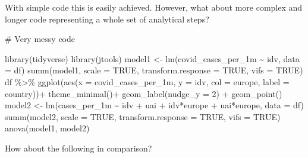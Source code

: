 \documentclass[
  letterpaper,
]{krantz}
\makeatletter
\newenvironment{Shaded}{\begin{snugshade}}{\end{snugshade}}
\newcommand{\AttributeTok}[1]{\textcolor[rgb]{0.40,0.45,0.13}{#1}}
\newcommand{\CommentTok}[1]{\textcolor[rgb]{0.37,0.37,0.37}{#1}}
\newcommand{\ConstantTok}[1]{\textcolor[rgb]{0.56,0.35,0.01}{#1}}
\newcommand{\DecValTok}[1]{\textcolor[rgb]{0.68,0.00,0.00}{#1}}
\newcommand{\FunctionTok}[1]{\textcolor[rgb]{0.28,0.35,0.67}{#1}}
\newcommand{\NormalTok}[1]{\textcolor[rgb]{0.00,0.23,0.31}{#1}}
\newcommand{\OtherTok}[1]{\textcolor[rgb]{0.00,0.23,0.31}{#1}}
\newcommand{\SpecialCharTok}[1]{\textcolor[rgb]{0.37,0.37,0.37}{#1}}
\newenvironment{kframe}{%
\medskip{}
\setlength{\fboxsep}{.8em}
 \def\at@end@of@kframe{}%
 \ifinner\ifhmode%
  \def\at@end@of@kframe{\end{minipage}}%
  \begin{minipage}{\columnwidth}%
 \fi\fi%
 \def\FrameCommand##1{\hskip\@totalleftmargin \hskip-\fboxsep
 \colorbox{shadecolor}{##1}\hskip-\fboxsep
     \hskip-\linewidth \hskip-\@totalleftmargin \hskip\columnwidth}%
 \MakeFramed {\advance\hsize-\width
   \@totalleftmargin\z@ \linewidth\hsize
   \@setminipage}}%
 {\par\unskip\endMakeFramed%
 \at@end@of@kframe}
\renewenvironment{Shaded}{\begin{kframe}}{\end{kframe}}
\makeatother
\begin{document}
With simple code this is easily achieved. However, what about more
complex and longer code representing a whole set of analytical steps?

\begin{Shaded}
\begin{Highlighting}[]
\CommentTok{\# Very messy code}

\FunctionTok{library}\NormalTok{(tidyverse)}
\FunctionTok{library}\NormalTok{(jtools)}
\NormalTok{model1 }\OtherTok{\textless{}{-}} \FunctionTok{lm}\NormalTok{(covid\_cases\_per\_1m }\SpecialCharTok{\textasciitilde{}}\NormalTok{ idv, }\AttributeTok{data =}\NormalTok{ df)}
\FunctionTok{summ}\NormalTok{(model1, }\AttributeTok{scale =} \ConstantTok{TRUE}\NormalTok{, }\AttributeTok{transform.response =} \ConstantTok{TRUE}\NormalTok{, }\AttributeTok{vifs =} \ConstantTok{TRUE}\NormalTok{)}
\NormalTok{df }\SpecialCharTok{\%\textgreater{}\%} \FunctionTok{ggplot}\NormalTok{(}\FunctionTok{aes}\NormalTok{(}\AttributeTok{x =}\NormalTok{ covid\_cases\_per\_1m, }\AttributeTok{y =}\NormalTok{ idv, }\AttributeTok{col =}\NormalTok{ europe, }\AttributeTok{label =}\NormalTok{ country))}\SpecialCharTok{+}
\FunctionTok{theme\_minimal}\NormalTok{()}\SpecialCharTok{+} \FunctionTok{geom\_label}\NormalTok{(}\AttributeTok{nudge\_y =} \DecValTok{2}\NormalTok{) }\SpecialCharTok{+} \FunctionTok{geom\_point}\NormalTok{()}
\NormalTok{model2 }\OtherTok{\textless{}{-}} \FunctionTok{lm}\NormalTok{(cases\_per\_1m }\SpecialCharTok{\textasciitilde{}}\NormalTok{ idv }\SpecialCharTok{+}\NormalTok{ uai }\SpecialCharTok{+}\NormalTok{ idv}\SpecialCharTok{*}\NormalTok{europe }\SpecialCharTok{+}\NormalTok{ uai}\SpecialCharTok{*}\NormalTok{europe, }\AttributeTok{data =}\NormalTok{ df)}
\FunctionTok{summ}\NormalTok{(model2, }\AttributeTok{scale =} \ConstantTok{TRUE}\NormalTok{, }\AttributeTok{transform.response =} \ConstantTok{TRUE}\NormalTok{, }\AttributeTok{vifs =} \ConstantTok{TRUE}\NormalTok{)}
\FunctionTok{anova}\NormalTok{(model1, model2)}
\end{Highlighting}
\end{Shaded}

How about the following in comparison?
\end{document}
